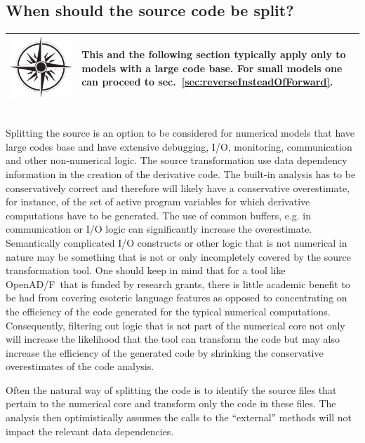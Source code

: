 \documentclass{book}
\newcommand{\OpenADF}{OpenAD/F}
\newcommand{\refsec}[1]{{sec.~\ref{#1}}}
\newcommand{\nav}[1]{
\begin{tabular}{|m{.03\textwidth}|m{.92\textwidth}|}\hline
\vspace{1mm}
\includegraphics[width=.03\textwidth]{windrose_zh1}&
\vspace{1mm}
\begin{minipage}[c]{.86\textwidth}
\small {#1}
\end{minipage}
\vspace{1mm}
\\\hline
\end{tabular}
}
\begin{document}
\subsection{When should the source code be split?}\label{sec:SplittingSource}
\nav{This and the following section typically apply only to models with a large code base.
For small models one can proceed to \refsec{sec:reverseInsteadOfForward}.}\\[1ex] 
Splitting the source is an option to be considered for numerical models that have 
large codes base and have extensive debugging, I/O, monitoring, communication and other 
non-numerical logic. 
The source transformation use data dependency information in the creation of the derivative 
code. The built-in analysis has to be conservatively correct and therefore will likely 
have a conservative overestimate, for instance, of the set of active program variables
for which derivative computations have to be generated. 
The use of common buffers, e.g. in communication or I/O logic can significantly increase the 
overestimate. 
Semantically complicated I/O constructs or other logic that 
is not numerical in nature may be something that is not or only incompletely covered by 
the source transformation tool. 
One should keep in mind that for a tool like \OpenADF\ that is funded by research grants, there is 
little academic benefit to be had from covering esoteric language features as opposed to concentrating 
on the efficiency of the code generated for the typical numerical computations. 
Consequently, filtering out logic that is not part of the numerical core not only will 
increase the likelihood that the tool can transform the code but may also  increase the 
efficiency of the generated code by shrinking the conservative overestimates of the code analysis.

Often the natural way of splitting the code is to identify the source files that pertain to 
the  numerical core and transform only the code in these files.  
The analysis then optimistically assumes the calls to the ``external'' methods will not impact the 
relevant data dependencies.          

\end{document}
